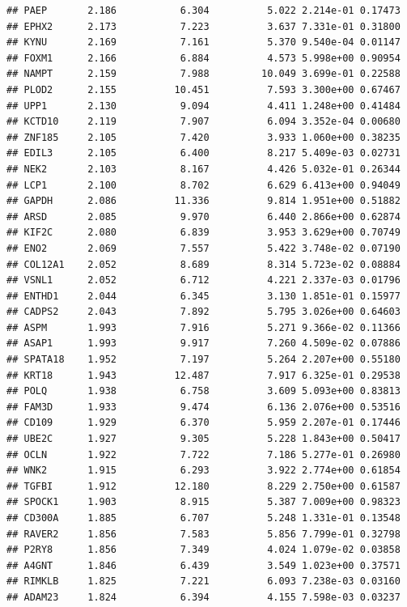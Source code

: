 \documentclass{article}\usepackage[]{graphicx}\usepackage[]{color}
\makeatletter
\newenvironment{kframe}{%
 \def\at@end@of@kframe{}%
 \ifinner\ifhmode%
  \def\at@end@of@kframe{\end{minipage}}%
  \begin{minipage}{\columnwidth}%
 \fi\fi%
 \def\FrameCommand##1{\hskip\@totalleftmargin \hskip-\fboxsep
 \colorbox{shadecolor}{##1}\hskip-\fboxsep
     \hskip-\linewidth \hskip-\@totalleftmargin \hskip\columnwidth}%
 \MakeFramed {\advance\hsize-\width
   \@totalleftmargin\z@ \linewidth\hsize
   \@setminipage}}%
 {\par\unskip\endMakeFramed%
 \at@end@of@kframe}
\newenvironment{knitrout}{}{} %
\makeatother
\begin{document}
\begin{knitrout}
\begin{kframe}
\begin{verbatim}
## PAEP       2.186           6.304          5.022 2.214e-01 0.17473
## EPHX2      2.173           7.223          3.637 7.331e-01 0.31800
## KYNU       2.169           7.161          5.370 9.540e-04 0.01147
## FOXM1      2.166           6.884          4.573 5.998e+00 0.90954
## NAMPT      2.159           7.988         10.049 3.699e-01 0.22588
## PLOD2      2.155          10.451          7.593 3.300e+00 0.67467
## UPP1       2.130           9.094          4.411 1.248e+00 0.41484
## KCTD10     2.119           7.907          6.094 3.352e-04 0.00680
## ZNF185     2.105           7.420          3.933 1.060e+00 0.38235
## EDIL3      2.105           6.400          8.217 5.409e-03 0.02731
## NEK2       2.103           8.167          4.426 5.032e-01 0.26344
## LCP1       2.100           8.702          6.629 6.413e+00 0.94049
## GAPDH      2.086          11.336          9.814 1.951e+00 0.51882
## ARSD       2.085           9.970          6.440 2.866e+00 0.62874
## KIF2C      2.080           6.839          3.953 3.629e+00 0.70749
## ENO2       2.069           7.557          5.422 3.748e-02 0.07190
## COL12A1    2.052           8.689          8.314 5.723e-02 0.08884
## VSNL1      2.052           6.712          4.221 2.337e-03 0.01796
## ENTHD1     2.044           6.345          3.130 1.851e-01 0.15977
## CADPS2     2.043           7.892          5.795 3.026e+00 0.64603
## ASPM       1.993           7.916          5.271 9.366e-02 0.11366
## ASAP1      1.993           9.917          7.260 4.509e-02 0.07886
## SPATA18    1.952           7.197          5.264 2.207e+00 0.55180
## KRT18      1.943          12.487          7.917 6.325e-01 0.29538
## POLQ       1.938           6.758          3.609 5.093e+00 0.83813
## FAM3D      1.933           9.474          6.136 2.076e+00 0.53516
## CD109      1.929           6.370          5.959 2.207e-01 0.17446
## UBE2C      1.927           9.305          5.228 1.843e+00 0.50417
## OCLN       1.922           7.722          7.186 5.277e-01 0.26980
## WNK2       1.915           6.293          3.922 2.774e+00 0.61854
## TGFBI      1.912          12.180          8.229 2.750e+00 0.61587
## SPOCK1     1.903           8.915          5.387 7.009e+00 0.98323
## CD300A     1.885           6.707          5.248 1.331e-01 0.13548
## RAVER2     1.856           7.583          5.856 7.799e-01 0.32798
## P2RY8      1.856           7.349          4.024 1.079e-02 0.03858
## A4GNT      1.846           6.439          3.549 1.023e+00 0.37571
## RIMKLB     1.825           7.221          6.093 7.238e-03 0.03160
## ADAM23     1.824           6.394          4.155 7.598e-03 0.03237

\end{verbatim}
\end{kframe}
\end{knitrout}
\end{document}
